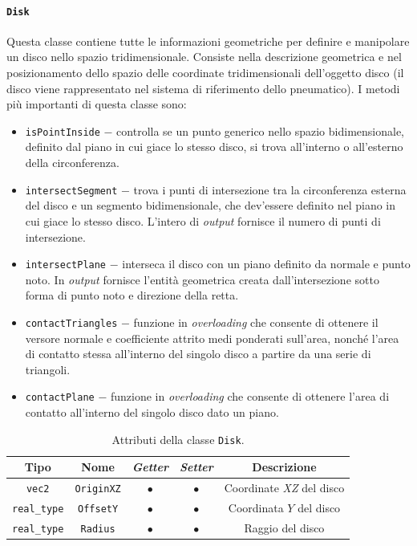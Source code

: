 \paragraph{\texttt{Disk}}
Questa classe contiene tutte le informazioni geometriche per definire e manipolare un disco nello spazio tridimensionale. Consiste nella descrizione geometrica e nel posizionamento dello spazio delle coordinate tridimensionali dell'oggetto disco (il disco viene rappresentato nel sistema di riferimento dello pneumatico). I metodi più importanti di questa classe sono:
\begin{itemize}
	\item \texttt{isPointInside} $-$ controlla se un punto generico nello spazio bidimensionale, definito dal piano in cui giace lo stesso disco, si trova all'interno o all'esterno della circonferenza.
	\item \texttt{intersectSegment} $-$ trova i punti di intersezione tra la circonferenza esterna del disco e un segmento bidimensionale, che dev'essere definito nel piano in cui giace lo stesso disco. L'intero di \textit{output} fornisce il numero di punti di intersezione.
	\item \texttt{intersectPlane} $-$ interseca il disco con un piano definito da normale e punto noto. In \textit{output} fornisce l'entità geometrica creata dall'intersezione sotto forma di punto noto e direzione della retta.
	\item \texttt{contactTriangles} $-$ funzione in \textit{overloading} che consente di ottenere il versore normale e coefficiente attrito medi ponderati sull'area, nonché l'area di contatto stessa all'interno del singolo disco a partire da una serie di triangoli.
	\item \texttt{contactPlane} $-$ funzione in \textit{overloading} che consente di ottenere l'area di contatto all'interno del singolo disco dato un piano.
\end{itemize}
\begin{table}[h!]
	\centering
	\begin{tabular}{|c|c|c|c|c|}
		\hline 
		\textbf{Tipo} & \textbf{Nome} & \textit{\textbf{Getter}} & \textit{\textbf{Setter}} & \textbf{Descrizione} \\ \hline 
		\texttt{vec2} & \texttt{OriginXZ} & $\bullet$ & $\bullet$ & Coordinate \textit{XZ} del disco \\ \hline 
		\texttt{real\_type} & \texttt{OffsetY} & $\bullet$ & $\bullet$ & Coordinata $Y$ del disco \\ \hline
		\texttt{real\_type} & \texttt{Radius} & $\bullet$ & $\bullet$ & Raggio del disco \\ \hline
	\end{tabular}
	\caption{Attributi della classe \texttt{Disk}.}
	\label{}
\end{table}
%
